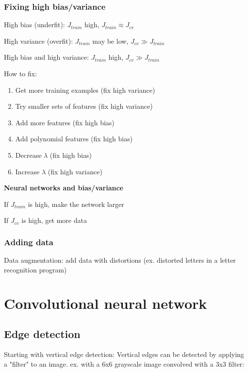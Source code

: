 \documentclass[12pt]{article}
\begin{document}
\subsubsection{Fixing high bias/variance}

High bias (underfit): $J_{train}$ high, $J_{train} \approx J_{cv}$

High variance (overfit): $J_{train}$ may be low, $J_{cv} \gg J_{train}$

High bias and high variance: $J_{train}$ high, $J_{cv} \gg J_{train}$

How to fix:

\begin{enumerate}
\item Get more training examples (fix high variance)
\item Try smaller sets of features (fix high variance)
\item Add more features (fix high bias)
\item Add polynomial features (fix high bias)
\item Decrease $\lambda$ (fix high bias)
\item Increase $\lambda$ (fix high variance)
\end{enumerate}

\textbf{Neural networks and bias/variance}

If $J_{train}$ is high, make the network larger

If $J_{cv}$ is high, get more data

\subsubsection{Adding data}

Data augmentation: add data with distortions (ex. distorted letters in a letter recognition program)

\section{Convolutional neural network}

\subsection{Edge detection}

Starting with vertical edge detection: Vertical edges can be detected by applying
a "filter" to an image. ex. with a 6x6 grayscale image convolved with a 3x3 filter:
\end{document}
